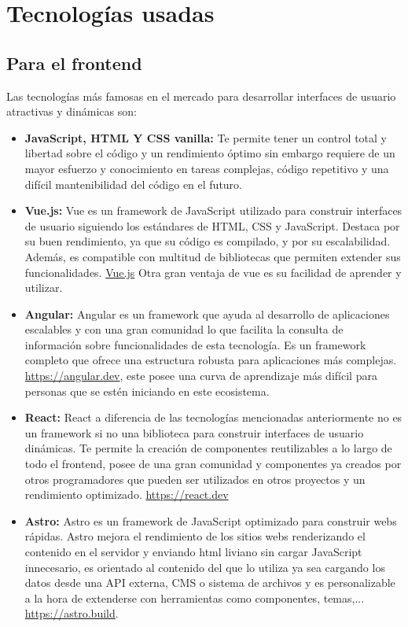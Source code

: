 \section{Tecnologías usadas}
\subsection{Para el frontend}
Las tecnologías más famosas en el mercado para desarrollar interfaces de usuario atractivas y dinámicas son:
\begin{itemize}
    \item \textbf{JavaScript, HTML Y CSS vanilla:} Te permite tener un control total y libertad sobre el código y un rendimiento óptimo sin embargo requiere de un mayor esfuerzo y conocimiento en tareas complejas, código repetitivo y una difícil mantenibilidad del código en el futuro.
    \item \textbf{Vue.js:} Vue es un framework de JavaScript utilizado para construir interfaces de usuario siguiendo los estándares de HTML, CSS y JavaScript. Destaca por su buen rendimiento, ya que su código es compilado, y por su escalabilidad. Además, es compatible con multitud de bibliotecas que permiten extender sus funcionalidades. \href{https://vuejs.org}{Vue.js} Otra
gran ventaja de vue es su facilidad de aprender y utilizar.
    \item \textbf{Angular:} Angular es un framework que ayuda al desarrollo de aplicaciones escalables y con una gran comunidad lo que facilita la consulta de información sobre funcionalidades de esta tecnología. Es un framework completo que ofrece una estructura robusta para aplicaciones más complejas. \hyperlink{Angular}{https://angular.dev}, este posee una curva de aprendizaje más difícil para personas que se estén iniciando en este ecosistema.
    \item \textbf{React:} React a diferencia de las tecnologías mencionadas anteriormente no es un framework si no una biblioteca para construir interfaces de usuario dinámicas. Te permite la creación de componentes reutilizables a lo largo de todo el frontend, posee de una gran comunidad y componentes ya creados por otros programadores que pueden ser utilizados en otros proyectos y un rendimiento optimizado. \hyperlink{React}{https://react.dev}
    \item \textbf{Astro:} Astro es un framework de JavaScript optimizado para construir webs rápidas. Astro mejora el rendimiento de los sitios webs renderizando el contenido en el servidor y enviando html liviano sin cargar JavaScript innecesario, es orientado al contenido del que lo utiliza ya sea cargando los datos desde una API externa, CMS o sistema de archivos y es personalizable a la hora de extenderse con herramientas como componentes, temas,... \hyperlink{Astro}{https://astro.build}.
\end{itemize}

